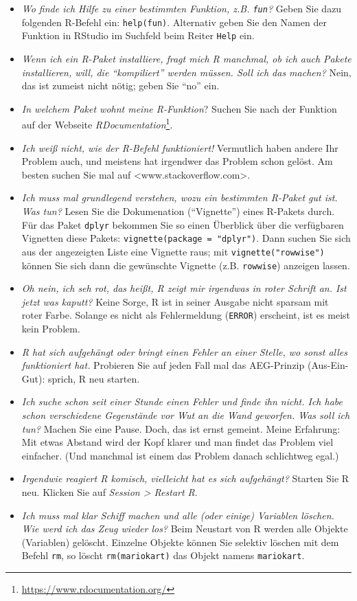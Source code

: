 \documentclass[
  letterpaper,
  twoside,
  open=any]{scrbook}
\providecommand{\tightlist}{%
  \setlength{\itemsep}{0pt}\setlength{\parskip}{0pt}}\usepackage{longtable,booktabs,array}
\theoremstyle{definition}
\theoremstyle{definition}
\theoremstyle{definition}
\theoremstyle{remark}
\begin{document}
\begin{itemize}
\tightlist
\item
  \emph{Wo finde ich Hilfe zu einer bestimmten Funktion, z.B.
  \texttt{fun}?} Geben Sie dazu folgenden R-Befehl ein:
  \texttt{help(fun)}. Alternativ geben Sie den Namen der Funktion in
  RStudio im Suchfeld beim Reiter \texttt{Help} ein.
\item
  \emph{Wenn ich ein R-Paket installiere, fragt mich R manchmal, ob ich
  auch Pakete installieren, will, die \enquote{kompiliert} werden
  müssen. Soll ich das machen?} Nein, das ist zumeist nicht nötig; geben
  Sie \enquote{no} ein.
\item
  \emph{In welchem Paket wohnt meine R-Funktion}? Suchen Sie nach der
  Funktion auf der Webseite \emph{RDocumentation}\footnote{\url{https://www.rdocumentation.org/}}.
\item
  \emph{Ich weiß nicht, wie der R-Befehl funktioniert!} Vermutlich haben
  andere Ihr Problem auch, und meistens hat irgendwer das Problem schon
  gelöst. Am besten suchen Sie mal auf
  \textless www.stackoverflow.com\textgreater.
\item
  \emph{Ich muss mal grundlegend verstehen, wozu ein bestimmten R-Paket
  gut ist. Was tun?} Lesen Sie die Dokumenation (\enquote{Vignette})
  eines R-Pakets durch. Für das Paket \texttt{dplyr} bekommen Sie so
  einen Überblick über die verfügbaren Vignetten diese Pakets:
  \texttt{vignette(package\ =\ "dplyr")}. Dann suchen Sie sich aus der
  angezeigten Liste eine Vignette raus; mit \texttt{vignette("rowwise")}
  können Sie sich dann die gewünschte Vignette (z.B. \texttt{rowwise})
  anzeigen lassen.
\item
  \emph{Oh nein, ich seh rot, das heißt, R zeigt mir irgendwas in roter
  Schrift an. Ist jetzt was kaputt?} Keine Sorge, R ist in seiner
  Ausgabe nicht sparsam mit roter Farbe. Solange es nicht als
  Fehlermeldung (\texttt{ERROR}) erscheint, ist es meist kein Problem.
\item
  \emph{R hat sich aufgehängt oder bringt einen Fehler an einer Stelle,
  wo sonst alles funktioniert hat.} Probieren Sie auf jeden Fall mal das
  AEG-Prinzip (Aus-Ein-Gut): sprich, R neu starten.
\item
  \emph{Ich suche schon seit einer Stunde einen Fehler und finde ihn
  nicht. Ich habe schon verschiedene Gegenstände vor Wut an die Wand
  geworfen. Was soll ich tun?} Machen Sie eine Pause. Doch, das ist
  ernst gemeint. Meine Erfahrung: Mit etwas Abstand wird der Kopf klarer
  und man findet das Problem viel einfacher. (Und manchmal ist einem das
  Problem danach schlichtweg egal.)
\item
  \emph{Irgendwie reagiert R komisch, vielleicht hat es sich
  aufgehängt?} Starten Sie R neu. Klicken Sie auf \emph{Session
  \textgreater{} Restart R}.
\item
  \emph{Ich muss mal klar Schiff machen und alle (oder einige) Variablen
  löschen. Wie werd ich das Zeug wieder los?} Beim Neustart von R werden
  alle Objekte (Variablen) gelöscht. Einzelne Objekte können Sie
  selektiv löschen mit dem Befehl \texttt{rm}, so löscht
  \texttt{rm(mariokart)} das Objekt namens \texttt{mariokart}.
\end{itemize}
\end{document}
